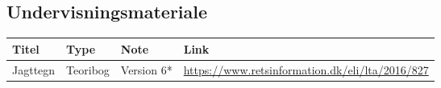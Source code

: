 \documentclass[10pt,a4paper]{article}
\begin{document}
\vspace{1cm}

\subsection*{Undervisningsmateriale}

{\footnotesize %
\setlength{\tabcolsep}{4pt} %
\renewcommand{\arraystretch}{1.3} %

\centering
\begin{tabular}{|P{5cm}|P{3cm}|P{4cm}|P{4cm}|}
\hline
\textbf{Titel} & \textbf{Type} & \textbf{Note} & \textbf{Link} \\
\hline

Jagttegn & Teoribog & Version 6* & \url{https://www.retsinformation.dk/eli/lta/2016/827} \\
\hline
\end{tabular}
}
\end{document}
